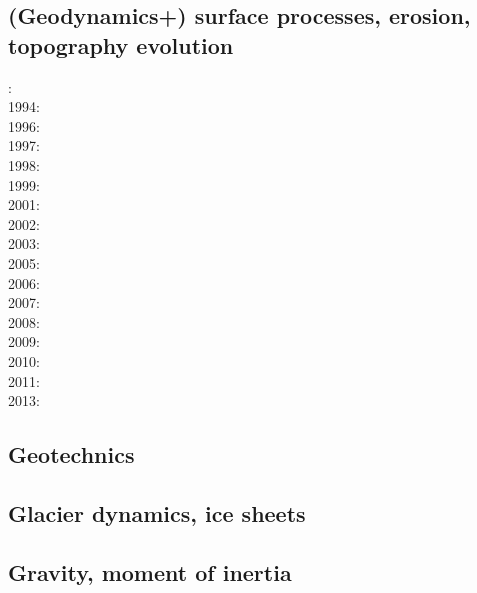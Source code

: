 \subsection*{(Geodynamics+) surface processes, erosion, topography evolution}

: \cite{befh92}\\
1994: \cite{howa94}\\
1996: \cite{avbu96}\\
1997: \cite{brsa97}\\
1998: \cite{deea98}\\
1999: \cite{will99a}\cite{bupi99}\cite{babr99}\\
2001: \cite{zemk01}\cite{tulg01}\cite{brsh01}\cite{bupo01}\\
2002: \cite{wibr02}\\
2003: \cite{brau03}\\
2005: \cite{lave05}\cite{will05}\\
2006: \cite{rosw06}\cite{brau06gsl}\\
2007: \cite{buto07}\\
2008: \cite{alle08}\cite{rowf08}\\
2009: \cite{whip09}\\
2010: \cite{will10}\cite{tuha10}\cite{brau10b}\cite{brau10}\cite{brya10}\\
2011: \cite{robr11}\\
2013: \cite{vehc13}\cite{brwi13}

\subsection*{Geotechnics}

\cite{zhll03}

\subsection*{Glacier dynamics, ice sheets}

\cite{asbl06}
\cite{zhjg11}
\cite{lejx14}
\cite{issg15}

\subsection*{Gravity, moment of inertia}

